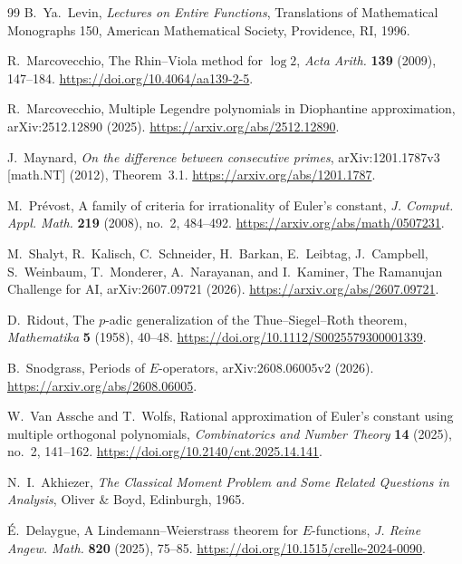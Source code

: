 \begin{thebibliography}{99}
B.~Ya.~Levin,
\newblock \emph{Lectures on Entire Functions},
\newblock Translations of Mathematical Monographs 150,
American Mathematical Society, Providence, RI, 1996.

R.~Marcovecchio,
\newblock The Rhin--Viola method for \(\log 2\),
\newblock \emph{Acta Arith.} \textbf{139} (2009), 147--184.
\newblock \url{https://doi.org/10.4064/aa139-2-5}.

R.~Marcovecchio,
\newblock Multiple Legendre polynomials in Diophantine approximation,
\newblock arXiv:2512.12890 (2025).
\newblock \url{https://arxiv.org/abs/2512.12890}.

J.~Maynard,
\newblock \emph{On the difference between consecutive primes},
\newblock arXiv:1201.1787v3 [math.NT] (2012), Theorem~3.1.
\newblock \url{https://arxiv.org/abs/1201.1787}.

M.~Pr\'evost,
\newblock A family of criteria for irrationality of Euler's constant,
\newblock \emph{J. Comput. Appl. Math.} \textbf{219} (2008), no.~2,
484--492.
\newblock \url{https://arxiv.org/abs/math/0507231}.

M.~Shalyt, R.~Kalisch, C.~Schneider, H.~Barkan, E.~Leibtag,
J.~Campbell, S.~Weinbaum, T.~Monderer, A.~Narayanan, and I.~Kaminer,
\newblock The Ramanujan Challenge for AI,
\newblock arXiv:2607.09721 (2026).
\newblock \url{https://arxiv.org/abs/2607.09721}.

D.~Ridout,
\newblock The \(p\)-adic generalization of the Thue--Siegel--Roth theorem,
\newblock \emph{Mathematika} \textbf{5} (1958), 40--48.
\newblock \url{https://doi.org/10.1112/S0025579300001339}.

B.~Snodgrass,
\newblock Periods of \(E\)-operators,
\newblock arXiv:2608.06005v2 (2026).
\newblock \url{https://arxiv.org/abs/2608.06005}.

W.~Van Assche and T.~Wolfs,
\newblock Rational approximation of Euler's constant using multiple
orthogonal polynomials,
\newblock \emph{Combinatorics and Number Theory} \textbf{14} (2025),
no.~2, 141--162.
\newblock \url{https://doi.org/10.2140/cnt.2025.14.141}.

N.~I.~Akhiezer,
\newblock \emph{The Classical Moment Problem and Some Related Questions in
Analysis},
\newblock Oliver \& Boyd, Edinburgh, 1965.

\'E.~Delaygue,
\newblock A Lindemann--Weierstrass theorem for \(E\)-functions,
\newblock \emph{J. Reine Angew. Math.} \textbf{820} (2025), 75--85.
\newblock \url{https://doi.org/10.1515/crelle-2024-0090}.


\end{thebibliography}
